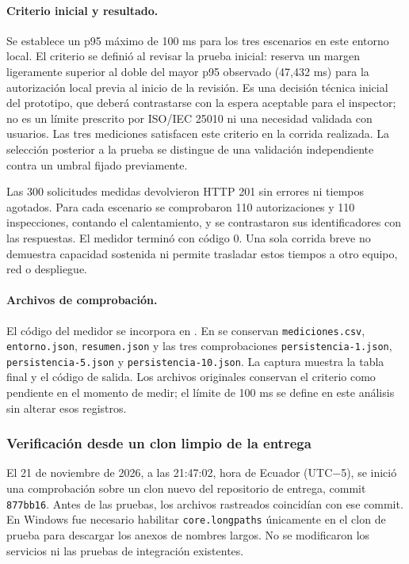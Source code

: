 \documentclass[11pt,a4paper]{article}
\begin{document}
	\paragraph{Criterio inicial y resultado.}
	Se establece un p95 máximo de 100 ms para los tres escenarios en este entorno local. El criterio se definió al revisar la prueba inicial: reserva un margen ligeramente superior al doble del mayor p95 observado (47,432 ms) para la autorización local previa al inicio de la revisión. Es una decisión técnica inicial del prototipo, que deberá contrastarse con la espera aceptable para el inspector; no es un límite prescrito por ISO/IEC 25010 ni una necesidad validada con usuarios. Las tres mediciones satisfacen este criterio en la corrida realizada. La selección posterior a la prueba se distingue de una validación independiente contra un umbral fijado previamente.
	
	Las 300 solicitudes medidas devolvieron HTTP 201 sin errores ni tiempos agotados. Para cada escenario se comprobaron 110 autorizaciones y 110 inspecciones, contando el calentamiento, y se contrastaron sus identificadores con las respuestas. El medidor terminó con código 0. Una sola corrida breve no demuestra capacidad sostenida ni permite trasladar estos tiempos a otro equipo, red o despliegue.
	
	\paragraph{Archivos de comprobación.}
	{\raggedright El código del medidor se incorpora en . En  se conservan \texttt{mediciones.csv}, \texttt{entorno.json}, \texttt{resumen.json} y las tres comprobaciones \texttt{persistencia-1.json}, \texttt{persistencia-5.json} y \texttt{persistencia-10.json}. La captura  muestra la tabla final y el código de salida. Los archivos originales conservan el criterio como pendiente en el momento de medir; el límite de 100 ms se define en este análisis sin alterar esos registros.\par}
	

	\subsubsection{Verificación desde un clon limpio de la entrega}\label{sec:verificacion-calidad-e1}
	El 21 de noviembre de 2026, a las 21:47:02, hora de Ecuador (UTC$-$5), se inició una comprobación sobre un clon nuevo del repositorio de entrega, commit \texttt{877bb16}. Antes de las pruebas, los archivos rastreados coincidían con ese commit. En Windows fue necesario habilitar \texttt{core.longpaths} únicamente en el clon de prueba para descargar los anexos de nombres largos. No se modificaron los servicios ni las pruebas de integración existentes.
	
\end{document}

